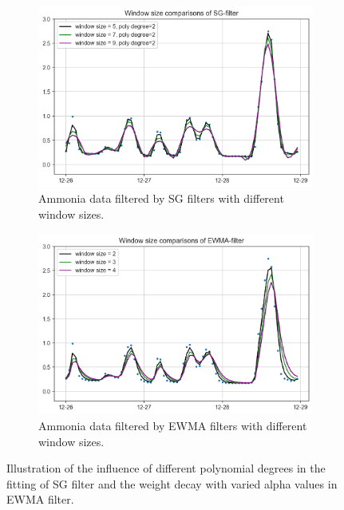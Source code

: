 \begin{figure}[!ht]
    \centering
    \begin{subfigure}{0.7\textwidth}
      \includegraphics[width=\linewidth]{imgs/pre-processing/sg-filter.png}
      \caption{Ammonia data filtered by SG filters with different window sizes.} \label{fig:smoothed-sg}
    \end{subfigure}%
    \hspace{2em}%
    \begin{subfigure}{0.7\textwidth}
      \includegraphics[width=\linewidth]{imgs/pre-processing/ew-filter.png}
      \caption{Ammonia data filtered by EWMA filters with different window sizes.} \label{fig:smoothed-ew}
    \end{subfigure}%
  \caption{Illustration of the influence of different polynomial degrees in the fitting of SG filter and the weight decay with varied alpha values in EWMA filter.} \label{fig:smoothed}
\end{figure}


